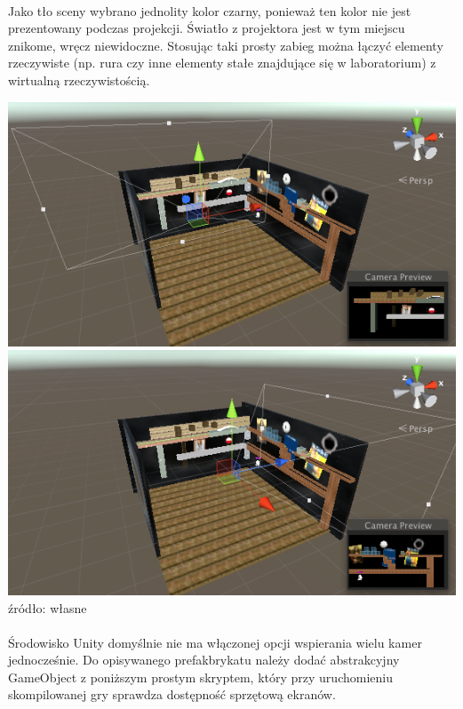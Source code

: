 \paragraph{}
Jako tło sceny wybrano jednolity kolor czarny, ponieważ ten kolor nie jest prezentowany podczas projekcji. Światło z projektora jest w tym miejscu znikome, wręcz niewidoczne. Stosując taki prosty zabieg można łączyć elementy rzeczywiste (np. rura czy inne elementy stałe znajdujące się w laboratorium) z wirtualną rzeczywistością.

\begin{center}
\includegraphics[width=1\textwidth]{images/kamera1.png}
\includegraphics[width=1\textwidth]{images/kamera2.png}
\small {źródło: własne }
\end{center}

\paragraph{}
Środowisko Unity domyślnie nie ma włączonej opcji wspierania wielu kamer jednocześnie. Do opisywanego prefakbrykatu należy dodać abstrakcyjny GameObject z poniższym prostym skryptem, który przy uruchomieniu skompilowanej gry sprawdza dostępność sprzętową ekranów.

